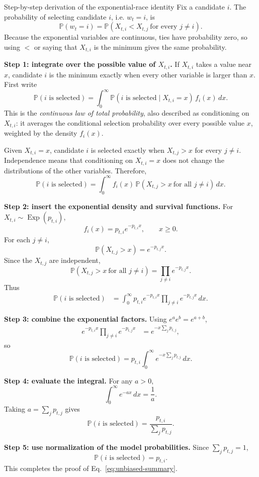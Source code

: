 \documentclass[11pt]{article}
\DeclareRobustCommand{\iperpaper}[2]{%
  \begingroup
  \hypersetup{pdfborder=0 0 0}%
  \href{iperpaper:#1}{{\color{iperpaperlink}#2}}%
  \endgroup
}
\def\iperpaper#1#2{#2}%
\newcommand{\Exp}{\operatorname{Exp}}
\newcommand{\Pp}{\mathbb{P}}
\begin{document}
\begin{leveltwo}{Step-by-step derivation of the exponential-race identity}
Fix a candidate $i$. The probability of selecting candidate $i$, i.e. $w_t=i$, is
\[
  \Pp(w_t=i)
  =\Pp\!\left(X_{t,i}<X_{t,j}\ \text{for every }j\ne i\right).
\]
Because the exponential variables are continuous, ties have probability zero, so using $<$ or saying that $X_{t,i}$ is the minimum gives the same probability.

\textbf{Step 1: integrate over the possible value of $X_{t,i}$.}
If $X_{t,i}$ takes a value near $x$, candidate $i$ is the minimum exactly when every other variable is larger than $x$. First write
\[
  \Pp(i\text{ is selected})
  =\int_0^\infty
    \Pp(i\text{ is selected}\mid X_{t,i}=x)\,
    f_i(x)\,dx.
\]
This is the \emph{continuous law of total probability}, also described as conditioning on $X_{t,i}$: it averages the conditional selection probability over every possible value $x$, weighted by the density $f_i(x)$.

Given $X_{t,i}=x$, candidate $i$ is selected exactly when $X_{t,j}>x$ for every $j\ne i$. Independence means that conditioning on $X_{t,i}=x$ does not change the distributions of the other variables. Therefore,
\[
  \Pp(i\text{ is selected})
  =\int_0^\infty
    f_i(x)\,
    \Pp(X_{t,j}>x\ \text{for all }j\ne i)
    \,dx.
\]

\textbf{Step 2: insert the exponential density and survival functions.}
For $X_{t,i}\sim\iperpaper{exp_symbol}{\Exp}(p_{t,i})$,
\[
  f_i(x)=p_{t,i}e^{-p_{t,i}x},\qquad x\ge0.
\]
For each $j\ne i$,
\[
  \Pp(X_{t,j}>x)=e^{-p_{t,j}x}.
\]
Since the $X_{t,j}$ are independent,
\[
  \Pp(X_{t,j}>x\ \text{for all }j\ne i)
  =\prod_{j\ne i}e^{-p_{t,j}x}.
\]
Thus
\begin{align*}
  \Pp(i\text{ is selected})
  &=\int_0^\infty
      p_{t,i}e^{-p_{t,i}x}
      \prod_{j\ne i}e^{-p_{t,j}x}\,dx.
\end{align*}

\textbf{Step 3: combine the exponential factors.}
Using $e^ae^b=e^{a+b}$,
\begin{align*}
  e^{-p_{t,i}x}\prod_{j\ne i}e^{-p_{t,j}x}
  &=e^{-x\sum_jp_{t,j}},
\end{align*}
so
\[
  \Pp(i\text{ is selected})
  =p_{t,i}\int_0^\infty e^{-x\sum_jp_{t,j}}\,dx.
\]

\textbf{Step 4: evaluate the integral.}
For any $a>0$,
\[
  \int_0^\infty e^{-ax}\,dx=\frac1a.
\]
Taking $a=\sum_jp_{t,j}$ gives
\[
  \Pp(i\text{ is selected})
  =\frac{p_{t,i}}{\sum_jp_{t,j}}.
\]

\textbf{Step 5: use normalization of the model probabilities.}
Since $\sum_jp_{t,j}=1$,
\[
  \Pp(i\text{ is selected})=p_{t,i}.
\]
This completes the proof of Eq.~\eqref{eq:unbiased-summary}.
\end{leveltwo}
\end{document}
